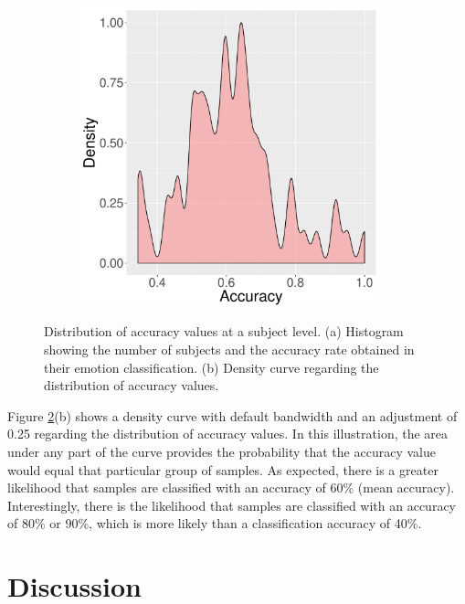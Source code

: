 \begin{figure}[ht]
\begin{subfigure}[b]{0.5\textwidth}
    \includegraphics[width=0.95\textwidth]{Content/figures/experiment2-density-user}
    \caption{}
    \label{fig:experiment2-chart-density}
  \end{subfigure}
  \caption{Distribution of accuracy values at a subject level. (a) Histogram showing the number of subjects and the accuracy rate obtained in their emotion classification. (b) Density curve regarding the distribution of accuracy values.}
  \label{fig:experiment2-result-charts}
\end{figure}

Figure \ref{fig:experiment2-result-charts}(b) shows a density curve with default bandwidth and an adjustment of 0.25 regarding the distribution of accuracy values. In this illustration, the area under any part of the curve provides the probability that the accuracy value would equal that particular group of samples. As expected, there is a greater likelihood that samples are classified with an accuracy of 60\% (mean accuracy). Interestingly, there is the likelihood that samples are classified with an accuracy of 80\% or 90\%, which is more likely than a classification accuracy of 40\%.


\section{Discussion}

